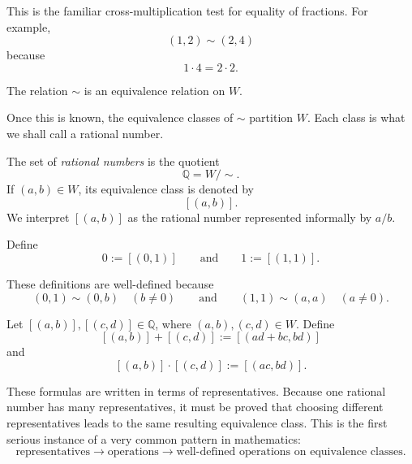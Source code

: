 \begin{remark}
This is the familiar cross-multiplication test for equality of fractions.  For example,
\[
(1,2)\sim(2,4)
\]
because
\[
1\cdot 4 = 2\cdot 2.
\]
\end{remark}

\begin{theorem}
\label{thm:fraction-pair-equivalence}
The relation $\sim$ is an equivalence relation on $W$.
\end{theorem}

\begin{remark}
Once this is known, the equivalence classes of $\sim$ partition $W$.  Each class is what we shall
call a rational number.
\end{remark}

\begin{definition}
\label{def:rational-numbers}

The set of \emph{rational numbers} is the quotient
\[
\mathbb{Q} = W/\sim.
\]
If $(a,b)\in W$, its equivalence class is denoted by
\[
[(a,b)].
\]
We interpret $[(a,b)]$ as the rational number represented informally by $a/b$.

\end{definition}

\begin{definition}
\label{def:rational-distinguished}

Define
\[
0 := [(0,1)]
\qquad\text{and}\qquad
1 := [(1,1)].
\]

\end{definition}

\begin{remark}
These definitions are well-defined because
\[
(0,1)\sim(0,b) \quad (b\neq 0)
\qquad\text{and}\qquad
(1,1)\sim(a,a) \quad (a\neq 0).
\]
\end{remark}

\begin{definition}
\label{def:rational-operations}

Let $[(a,b)],[(c,d)]\in\mathbb{Q}$, where $(a,b),(c,d)\in W$.  Define
\[
[(a,b)] + [(c,d)] := [(ad+bc,bd)]
\]
and
\[
[(a,b)]\cdot[(c,d)] := [(ac,bd)].
\]

\end{definition}

\begin{remark}
\label{rem:well-definedness-matters}

These formulas are written in terms of representatives.  Because one rational number has many
representatives, it must be proved that choosing different representatives leads to the same
resulting equivalence class.  This is the first serious instance of a very common pattern in
mathematics:
\[
\text{representatives}
\longrightarrow
\text{operations}
\longrightarrow
\text{well-defined operations on equivalence classes}.
\]

\end{remark}

